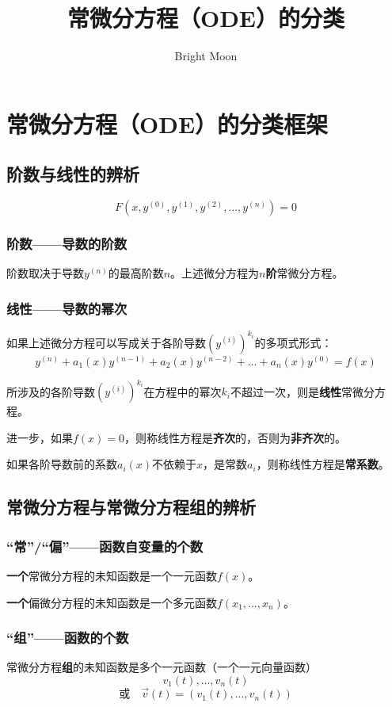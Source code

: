 \documentclass[UTF8]{ctexart}
\title{常微分方程（ODE）的分类}
\author{Bright Moon}
\begin{document}
\maketitle
\section{常微分方程（ODE）的分类框架}
\subsection{阶数与线性的辨析}
\[F(x,y^{(0)},y^{(1)},y^{(2)},...,y^{(n)})=0\]
\subsubsection{阶数——导数的阶数}
阶数取决于导数$y^{(n)}$的最高阶数$n$。上述微分方程为\textbf{$n$阶}常微分方程。
\subsubsection{线性——导数的幂次}
如果上述微分方程可以写成关于各阶导数$(y^{(i)})^{k_i}$的多项式形式：\[y^{(n)}+a_1(x)y^{(n-1)}+a_2(x)y^{(n-2)}+...+a_n(x)y^{(0)}=f(x)\]
\par 所涉及的各阶导数$(y^{(i)})^{k_i}$在方程中的幂次$k_i$不超过一次，则是\textbf{线性}常微分方程。
\par 进一步，如果$f(x)=0$，则称线性方程是\textbf{齐次}的，否则为\textbf{非齐次}的。
\par 如果各阶导数前的系数$a_i(x)$不依赖于$x$，是常数$a_i$，则称线性方程是\textbf{常系数}。

\subsection{常微分方程与常微分方程组的辨析}
\subsubsection{“常”/“偏”——函数自变量的个数}
\textbf{一个}常微分方程的未知函数是一个一元函数$f(x)$。
\par \textbf{一个}偏微分方程的未知函数是一个多元函数$f(x_1,...,x_n)$。
\subsubsection{“组”——函数的个数}
常微分方程\textbf{组}的未知函数是多个一元函数（一个一元向量函数）\[v_1(t),...,v_n(t)\] \[\text{或}\quad \vec  v(t) = (v_1(t),...,v_n(t))\]
\end{document}
